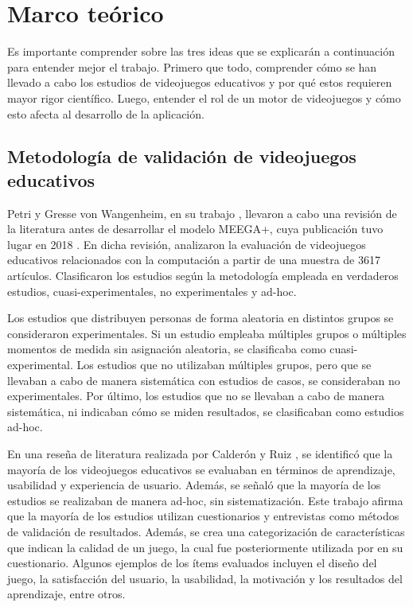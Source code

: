 \section{Marco teórico}

Es importante comprender sobre las tres ideas que se explicarán a continuación para entender mejor el trabajo. Primero que todo, comprender cómo se han llevado a cabo los estudios de videojuegos educativos y por qué estos requieren mayor rigor científico. Luego, entender el rol de un motor de videojuegos y cómo esto afecta al desarrollo de la aplicación.

\subsection{Metodología de validación de videojuegos educativos}

Petri y Gresse von Wangenheim, en su trabajo \cite{HowGamesComputingEducationEvaluated}, llevaron a cabo una revisión de la literatura antes de desarrollar el modelo MEEGA+, cuya publicación tuvo lugar en 2018 \cite{meegaplus}. En dicha revisión, analizaron la evaluación de videojuegos educativos relacionados con la computación a partir de una muestra de 3617 artículos. Clasificaron los estudios según la metodología empleada en verdaderos estudios, cuasi-experimentales, no experimentales y ad-hoc.

Los estudios que distribuyen personas de forma aleatoria en distintos grupos se consideraron experimentales. Si un estudio empleaba múltiples grupos o múltiples momentos de medida sin asignación aleatoria, se clasificaba como cuasi-experimental. Los estudios que no utilizaban múltiples grupos, pero que se llevaban a cabo de manera sistemática con estudios de casos, se consideraban no experimentales. Por último, los estudios que no se llevaban a cabo de manera sistemática, ni indicaban cómo se miden resultados, se clasificaban como estudios ad-hoc.

En una reseña de literatura realizada por Calderón y Ruiz \cite{CalderonRuizReviewSeriousGamesEvaluation}, se identificó que la mayoría de los videojuegos educativos se evaluaban en términos de aprendizaje, usabilidad y experiencia de usuario. Además, se señaló que la mayoría de los estudios se realizaban de manera ad-hoc, sin sistematización. Este trabajo afirma que la mayoría de los estudios utilizan cuestionarios y entrevistas como métodos de validación de resultados. Además, se crea una categorización de características que indican la calidad de un juego, la cual fue posteriormente utilizada por \cite{meegaplus} en su cuestionario. Algunos ejemplos de los ítems evaluados incluyen el diseño del juego, la satisfacción del usuario, la usabilidad, la motivación y los resultados del aprendizaje, entre otros.

